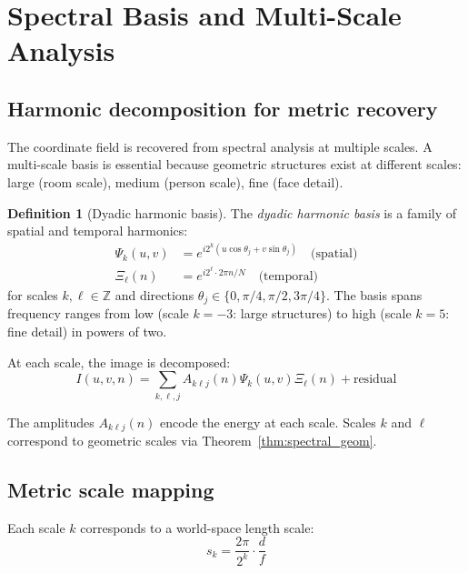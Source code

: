 \documentclass[11pt,twocolumn,a4paper]{article}
\theoremstyle{definition}
\newtheorem{definition}[theorem]{Definition}
\begin{document}
\section{Spectral Basis and Multi-Scale Analysis}
\label{sec:basis}

\subsection{Harmonic decomposition for metric recovery}

The coordinate field is recovered from spectral analysis at multiple scales. A multi-scale basis is essential because geometric structures exist at different scales: large (room scale), medium (person scale), fine (face detail).

\begin{definition}[Dyadic harmonic basis]
\label{def:dyadic}
The \emph{dyadic harmonic basis} is a family of spatial and temporal harmonics:
\begin{align}
\Psi_k(u, v) &= e^{i 2^k (u \cos\theta_j + v \sin\theta_j)} \quad \text{(spatial)} \\
\Xi_\ell(n) &= e^{i 2^\ell \cdot 2\pi n / N} \quad \text{(temporal)}
\end{align}
for scales $k, \ell \in \mathbb{Z}$ and directions $\theta_j \in \{0, \pi/4, \pi/2, 3\pi/4\}$. The basis spans frequency ranges from low (scale $k=-3$: large structures) to high (scale $k=5$: fine detail) in powers of two.
\end{definition}

At each scale, the image is decomposed:
\begin{equation}
I(u,v,n) = \sum_{k,\ell,j} A_{k\ell j}(n) \Psi_k(u,v) \Xi_\ell(n) + \text{residual}
\end{equation}

The amplitudes $A_{k\ell j}(n)$ encode the energy at each scale. Scales $k$ and $\ell$ correspond to geometric scales via Theorem~\ref{thm:spectral_geom}.

\subsection{Metric scale mapping}

Each scale $k$ corresponds to a world-space length scale:
\begin{equation}
s_k = \frac{2\pi}{2^k} \cdot \frac{d}{f}
\end{equation}
\end{document}
